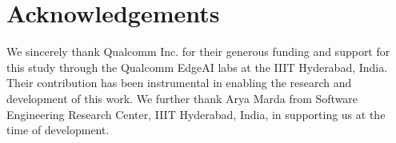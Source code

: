 \section{Acknowledgements}


We sincerely thank Qualcomm Inc. for their generous funding and support for this study through the Qualcomm EdgeAI labs at the IIIT Hyderabad, India. Their contribution has been instrumental in enabling the research and development of this work. We further thank Arya Marda from Software Engineering Research Center, IIIT Hyderabad, India, in supporting us at the time of development.